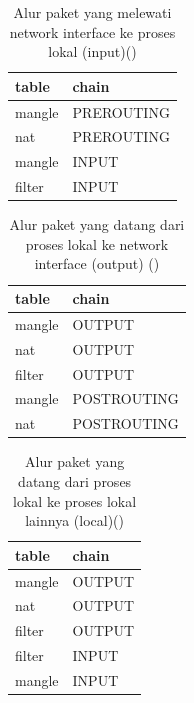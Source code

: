 \begin{table}[H]
	\caption{Alur paket yang melewati network interface ke proses lokal (input)(\cite{purdy2004linux})}
	\label{table:network_to_local}
	\centering
	\begin{tabular}{ll}
		\hline
		\rowcolor[HTML]{C0C0C0} 
		table  & chain      \\ \hline
		mangle & PREROUTING \\
		nat    & PREROUTING \\
		mangle & INPUT      \\
		filter & INPUT      \\ \hline
	\end{tabular}	
\end{table}

\begin{table}[H]
	\caption{Alur paket yang datang dari proses lokal ke network interface (output) (\cite{purdy2004linux})}
	\label{table:local_to_network}
	\centering
	\begin{tabular}{ll}
		\hline
		\rowcolor[HTML]{C0C0C0} 
		table  & chain       \\ \hline
		mangle & OUTPUT      \\
		nat    & OUTPUT      \\
		filter & OUTPUT      \\
		mangle & POSTROUTING \\
		nat    & POSTROUTING \\ \hline
	\end{tabular}
\end{table}

\begin{table}[H]
	\caption{Alur paket yang datang dari proses lokal ke proses lokal lainnya (local)(\cite{purdy2004linux})}
	\label{table:local_to_local}
	\centering
	\begin{tabular}{ll}
		\hline
		\rowcolor[HTML]{C0C0C0} 
		table  & chain  \\ \hline
		mangle & OUTPUT \\
		nat    & OUTPUT \\
		filter & OUTPUT \\
		filter & INPUT  \\
		mangle & INPUT  \\ \hline
	\end{tabular}
\end{table}
